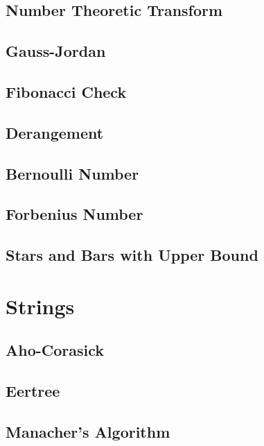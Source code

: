 \subsection{Number Theoretic Transform}

\subsection{Gauss-Jordan}

\subsection{Fibonacci Check}

\subsection{Derangement}

\subsection{Bernoulli Number}

\subsection{Forbenius Number}

\subsection{Stars and Bars with Upper Bound}

\section{Strings}
\subsection{Aho-Corasick}

\subsection{Eertree}

\subsection{Manacher's Algorithm}

